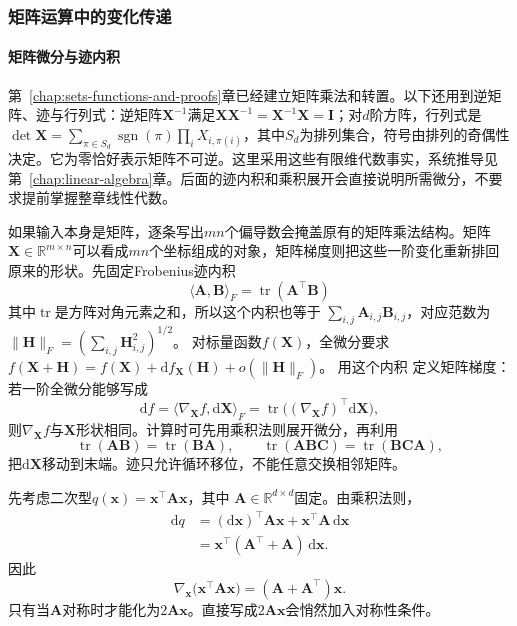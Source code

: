 \subsubsection{矩阵运算中的变化传递}

\paragraph{矩阵微分与迹内积}

第~\ref{chap:sets-functions-and-proofs}章已经建立矩阵乘法和转置。以下还用到逆矩阵、迹与行列式：逆矩阵$\bm X^{-1}$满足$\bm X\bm X^{-1}=\bm X^{-1}\bm X=\bm I$；对$d$阶方阵，行列式是$\det\bm X=\sum_{\pi\in S_d}\operatorname{sgn}(\pi)\prod_iX_{i,\pi(i)}$，其中$S_d$为排列集合，符号由排列的奇偶性决定。它为零恰好表示矩阵不可逆。这里采用这些有限维代数事实，系统推导见第~\ref{chap:linear-algebra}章。后面的迹内积和乘积展开会直接说明所需微分，不要求提前掌握整章线性代数。

如果输入本身是矩阵，逐条写出$mn$个偏导数会掩盖原有的矩阵乘法结构。矩阵$\bm{X}\in\mathbb{R}^{m\times n}$可以看成$mn$个坐标组成的对象，矩阵梯度则把这些一阶变化重新排回原来的形状。先固定Frobenius迹内积
\[   \langle\bm{A},\bm{B}\rangle_F   =   \operatorname{tr}(\bm{A}^{\top}\bm{B}) \]
其中$\operatorname{tr}$是方阵对角元素之和，所以这个内积也等于
$\sum_{i,j}\bm A_{i,j}\bm B_{i,j}$，对应范数为
$\lVert\bm H\rVert_F=(\sum_{i,j}\bm H_{i,j}^2)^{1/2}$。
对标量函数$f(\bm X)$，全微分要求
$f(\bm X+\bm H)=f(\bm X)+\mathrm df_{\bm X}(\bm H)+o(\lVert\bm H\rVert_F)$。
用这个内积
定义矩阵梯度：若一阶全微分能够写成
\begin{equation}
  \mathrm{d}f
  =
  \langle\nabla_{\bm{X}}f,\mathrm{d}\bm{X}\rangle_F
  =
  \operatorname{tr}\bigl((\nabla_{\bm{X}}f)^{\top}
  \mathrm{d}\bm{X}\bigr),
\label{eq:analysis-matrix-gradient-definition}
\end{equation}
则$\nabla_{\bm{X}}f$与$\bm{X}$形状相同。计算时可先用乘积法则展开微分，再利用
\[   \operatorname{tr}(\bm{A}\bm{B})   =\operatorname{tr}(\bm{B}\bm{A}),\qquad   \operatorname{tr}(\bm{A}\bm{B}\bm{C})   =\operatorname{tr}(\bm{B}\bm{C}\bm{A}), \]
把$\mathrm{d}\bm{X}$移动到末端。迹只允许循环移位，不能任意交换相邻矩阵。

先考虑二次型$q(\bm{x})=\bm{x}^{\top}\bm{A}\bm{x}$，其中 $\bm{A}\in\mathbb{R}^{d\times d}$固定。由乘积法则，
\begin{align*}
  \mathrm{d}q
  &=
  (\mathrm{d}\bm{x})^{\top}\bm{A}\bm{x}
  +\bm{x}^{\top}\bm{A}\,\mathrm{d}\bm{x}\\
  &=
  \bm{x}^{\top}(\bm{A}^{\top}+\bm{A})\,\mathrm{d}\bm{x}.
\end{align*}
因此
\begin{equation}
  \nabla_{\bm{x}}
  \bigl(\bm{x}^{\top}\bm{A}\bm{x}\bigr)
  =
  (\bm{A}+\bm{A}^{\top})\bm{x}.
\label{eq:analysis-quadratic-form-gradient}
\end{equation}
只有当$\bm{A}$对称时才能化为$2\bm{A}\bm{x}$。直接写成$2\bm{A}\bm{x}$会悄然加入对称性条件。

